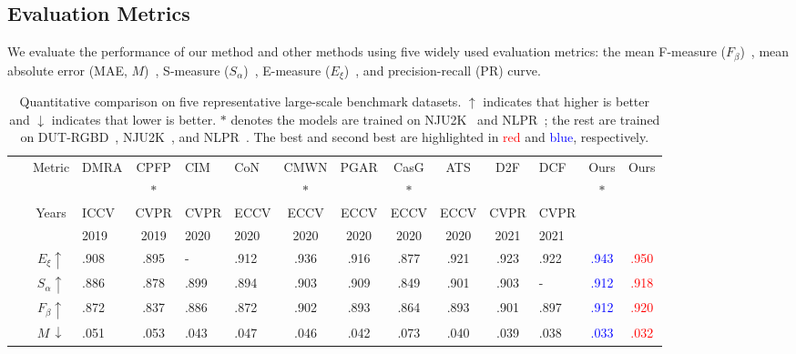 \documentclass[runningheads]{llncs}
\begin{document}
	\subsection{Evaluation Metrics}
	We evaluate the performance of our method and other methods using
	five widely used evaluation metrics: the mean F-measure ($F_{\beta}$)~\cite{achanta2009frequency}, mean absolute error (MAE, $M$)~\cite{borji2015salient}, S-measure ($S_{\alpha}$)~\cite{fan2017structure}, E-measure ($E_{\xi}$)~\cite{fan2018enhanced}, and precision-recall (PR) curve.
	
	\begin{table}[t]
		\scriptsize
		\begin{center}
			\caption{Quantitative comparison on five representative large-scale benchmark datasets. $\uparrow$ indicates that higher is better and $\downarrow$ indicates that lower is better. $*$ denotes the models are trained on NJU2K~\cite{ju2014depth} and NLPR~\cite{peng2014rgbd}; the rest are trained on DUT-RGBD~\cite{piao2019depth}, NJU2K~\cite{ju2014depth}, and NLPR~\cite{peng2014rgbd}. The best and second best are highlighted in \textcolor{red}{red} and \textcolor{blue}{blue}, respectively.}
			\label{table:qua}
			\begin{tabular}{p{0.7cm}<{\centering}|c|p{0.85cm}<{\centering}cp{0.75cm}<{\centering}p{0.75cm}<{\centering}cccccp{0.75cm}<{\centering}|cc}
				\hline
				\hline
				
				\multirow{2}{*}{} & \multirow{2}{*}{Metric} & DMRA & CPFP & CIM & CoN & CMWN & PGAR & CasG & ATS & D2F & DCF & Ours & Ours  \\
				&  & \cite{piao2019depth} & \cite{zhao2019contrast} $*$ & \cite{zhang2020select} & \cite{ji2020accurate} & \cite{li2020cross} $*$ & \cite{chen2020progressively} & \cite{luo2020cascade} $*$ & \cite{zhang2020asymmetric} & \cite{sun2021deep} & \cite{ji2021calibrated} & $*$ & \\ \hline
				\multirow{2}{*}{} & \multirow{2}{*}{Years} & ICCV & CVPR & CVPR & ECCV & ECCV & ECCV & ECCV & ECCV & CVPR & CVPR & &  \\ 
				&  & 2019 & 2019 & 2020 & 2020 & 2020 & 2020 & 2020 & 2020 & 2021 & 2021 & & \\ \hline
				
				\multirow{4}{*}{\rotatebox{90}{NJU2K}~\rotatebox{90}{~\cite{ju2014depth}}}    
				& $E_{\xi}\uparrow$ 
				& .908 & .895 & - & .912 & .936 & .916 & .877 & .921 & .923 & .922 & \textcolor{blue}{.943} & \textcolor{red}{.950} \\
				& $S_{\alpha}\uparrow$ 
				& .886 & .878 & .899 & .894 & .903 & .909 & .849 & .901 & .903 & - & \textcolor{blue}{.912} & \textcolor{red}{.918} \\
				& $F_{\beta}\uparrow$ 
				& .872 & .837 & .886 & .872 & .902 & .893 & .864 & .893 & .901 & .897 & \textcolor{blue}{.912} & \textcolor{red}{.920} \\
				& $M\,\downarrow$ 
				& .051 & .053 & .043 & .047 & .046 & .042 & .073 & .040 & .039 & .038 & \textcolor{blue}{.033} & \textcolor{red}{.032} \\ \hline
				

\end{tabular}
\end{center}
\end{table}
\end{document}
